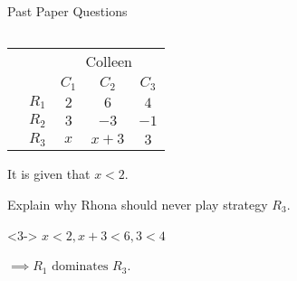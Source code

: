 \documentclass[8pt]{beamer}
\begin{document}
\begin{frame}{Past Paper Questions}
\begin{columns}[T]
\begin{column}{.5\linewidth}
\begin{problem}
		\begin{center}
\colorbox{cc}{
	\setlength\arrayrulewidth{0.5mm}
\begin{tabular}{cc|ccc}
	\multicolumn{2}{c}{} & \multicolumn{3}{c}{Colleen}\\
\multicolumn{1}{c}{} &  & $C_1$  & $C_2$ & $C_3$ \\ \hline
\raisebox{0.0cm}{\multirow{3}*{\rotatebox{90}{Rhona}}}  & $R_1$ & $2$ & $6$ & $4$ \\
& $R_2$ & $3$ & $-3$ & $-1$ \\
& $R_3$ & $x$ & $x+3$ & $3$ \\
\end{tabular}}
\end{center}

It is given that $x<2$.

Explain why Rhona should never play strategy  $ R_3$.
	\end{problem}
	\begin{solution}<3->
		$x<2,x+3<6,3<4$

		 $\implies R_1 \text{ dominates } R_3$.
	\end{solution}
	\end{column}
	\end{columns}
\end{frame}
\end{document}
